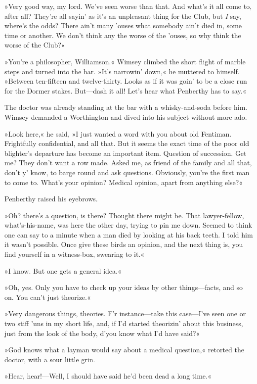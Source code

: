 »Very good way, my lord. We've seen worse than that. And what's it all come to, after all? They're all sayin' as it's an unpleasant thing for the Club, but \textit{I} say, where's the odds? There ain't many 'ouses what somebody ain't died in, some time or another. We don't think any the worse of the 'ouses, so why think the worse of the Club?«

»You're a philosopher, Williamson.« Wimsey climbed the short flight of marble steps and turned into the bar. »It's narrowin' down,« he muttered to himself. »Between ten-fifteen and twelve-thirty. Looks as if it was goin' to be a close run for the Dormer stakes. But—dash it all! Let's hear what Penberthy has to say.«

The doctor was already standing at the bar with a whisky-and-soda before him. Wimsey demanded a Worthington and dived into his subject without more ado.

»Look here,« he said, »I just wanted a word with you about old Fentiman. Frightfully confidential, and all that. But it seems the exact time of the poor old blighter's departure has become an important item. Question of succession. Get me? They don't want a row made. Asked me, as friend of the family and all that, don't y' know, to barge round and ask questions. Obviously, you're the first man to come to. What's your opinion? Medical opinion, apart from anything else?«

Penberthy raised his eyebrows.

»Oh? there's a question, is there? Thought there might be. That lawyer-fellow, what's-his-name, was here the other day, trying to pin me down. Seemed to think one can say to a minute when a man died by looking at his back teeth. I told him it wasn't possible. Once give these birds an opinion, and the next thing is, you find yourself in a witness-box, swearing to it.«

»I know. But one gets a general idea.«

»Oh, yes. Only you have to check up your ideas by other things—facts, and so on. You can't just theorize.«

»Very dangerous things, theories. F'r instance—take this case—I've seen one or two stiff 'uns in my short life, and, if I'd started theorizin' about this business, just from the look of the body, d'you know what I'd have said?«

»God knows what a layman would say about a medical question,« retorted the doctor, with a sour little grin.

»Hear, hear!—Well, I should have said he'd been dead a long time.«

